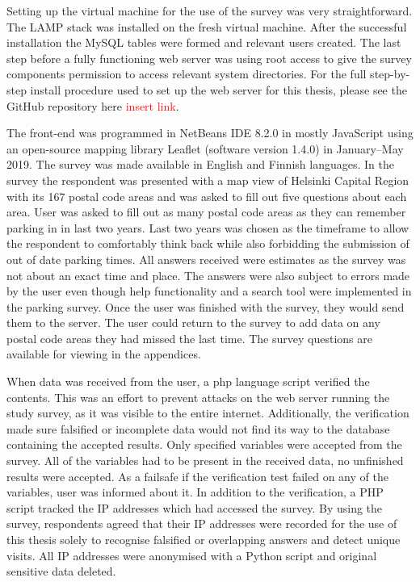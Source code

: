 Setting up the virtual machine for the use of the survey was very straightforward. The LAMP stack was installed on the fresh virtual machine. After the successful installation the MySQL tables were formed and relevant users created. The last step before a fully functioning web server was using root access to give the survey components permission to access relevant system directories. For the full step-by-step install procedure used to set up the web server for this thesis, please see the GitHub repository here \textcolor{red}{insert link}.

The front-end was programmed in NetBeans IDE 8.2.0 in mostly JavaScript using an open-source mapping library Leaflet (software version 1.4.0) in January--May 2019. The survey was made available in English and Finnish languages. In the survey the respondent was presented with a map view of Helsinki Capital Region with its 167 postal code areas and was asked to fill out five questions about each area. User was asked to fill out as many postal code areas as they can remember parking in in last two years. Last two years was chosen as the timeframe to allow the respondent to comfortably think back while also forbidding the submission of out of date parking times. All answers received were estimates as the survey was not about an exact time and place. The answers were also subject to errors made by the user even though help functionality and a search tool were implemented in the parking survey. Once the user was finished with the survey, they would send them to the server. The user could return to the survey to add data on any postal code areas they had missed the last time. The survey questions are available for viewing in the appendices.

When data was received from the user, a \gls{php} language script verified the contents. This was an effort to prevent attacks on the web server running the study survey, as it was visible to the entire internet. Additionally, the verification made sure falsified or incomplete data would not find its way to the database containing the accepted results. Only specified variables were accepted from the survey. All of the variables had to be present in the received data, no unfinished results were accepted. As a failsafe if the verification test failed on any of the variables, user was informed about it. In addition to the verification, a PHP script tracked the IP addresses which had accessed the survey. By using the survey, respondents agreed that their IP addresses were recorded for the use of this thesis solely to recognise falsified or overlapping answers and detect unique visits. All IP addresses were anonymised with a Python script and original sensitive data deleted.


